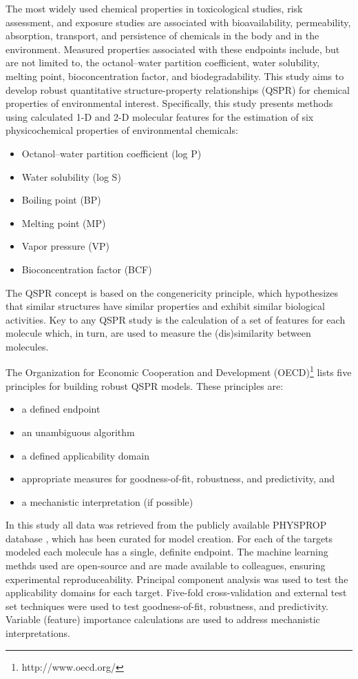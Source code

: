 \documentclass[10pt, letter]{article}
\renewcommand{\=}{\, =\, }
\newcommand{\+}{\, +\, }
\renewcommand{\-}{\, -\, }
\begin{document}
The most widely used chemical properties in toxicological
studies, risk assessment, and exposure studies are
associated with bioavailability, permeability, absorption,
transport, and persistence of chemicals in the body and
in the environment. Measured properties associated with these endpoints include,
but are not limited to, the octanol–water partition
coefficient, water solubility, melting point, bioconcentration
factor, and biodegradability. This study aims to develop robust quantitative structure-property relationships (QSPR) for chemical properties of environmental interest. Specifically, this study presents methods using calculated 1-D and 2-D molecular features for
the estimation of six physicochemical properties of environmental chemicals:
\begin{itemize}
\item Octanol–water partition coefficient (log P)
\item Water solubility (log S)
\item Boiling point (BP)
\item Melting point (MP)
\item Vapor pressure (VP)
\item Bioconcentration factor (BCF)
\end{itemize}

The QSPR concept
is based on the congenericity principle, which hypothesizes
that similar structures have similar properties and
exhibit similar biological activities. Key to any QSPR study is the calculation of a set of features for each molecule which, in turn, are used
to measure the (dis)similarity between molecules.

The Organization for Economic Cooperation and Development (OECD)\footnote{http://www.oecd.org/} lists five principles for building robust QSPR models. These principles are:
\begin{itemize}
\item a defined endpoint
\item an unambiguous algorithm
\item a defined applicability domain
\item appropriate measures for goodness-of-fit, robustness, and predictivity, and
\item a mechanistic interpretation (if possible)
\end{itemize}

In this study all data was retrieved from the publicly available PHYSPROP database \cite{howard2000physprop}, which has been curated for model creation. For each of the targets modeled
each molecule has a single, definite endpoint. The machine learning methds used are open-source and
are made available to colleagues, ensuring experimental reproduceability. Principal component analysis was used to test the applicability domains for each target. Five-fold cross-validation and external test set techniques were used to test goodness-of-fit, robustness, and predictivity. Variable (feature) importance calculations are used to address mechanistic interpretations.
\end{document}
